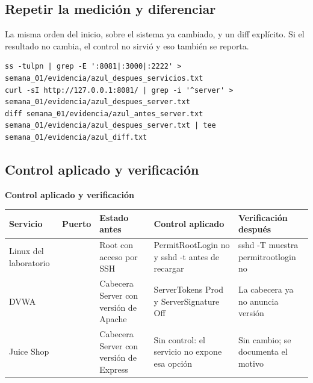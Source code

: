 \documentclass[11pt,a4paper]{article}
\begin{document}
\subsection{Repetir la medición y diferenciar}

La misma orden del inicio, sobre el sistema ya cambiado, y un diff explícito. Si el resultado no cambia, el control no sirvió y eso también se reporta.

\begin{lstlisting}[style=estiloCodigo]
ss -tulpn | grep -E ':8081|:3000|:2222' > semana_01/evidencia/azul_despues_servicios.txt
curl -sI http://127.0.0.1:8081/ | grep -i '^server' > semana_01/evidencia/azul_despues_server.txt
diff semana_01/evidencia/azul_antes_server.txt semana_01/evidencia/azul_despues_server.txt | tee semana_01/evidencia/azul_diff.txt
\end{lstlisting}

\subsection{Control aplicado y verificación}

\begin{center}
\begin{minipage}{\linewidth}
\centering
{\footnotesize
\textbf{Control aplicado y verificación}\par\smallskip
\begin{tabular}{@{}>{\raggedright\arraybackslash}p{2.20cm}>{\raggedright\arraybackslash}p{0.90cm}>{\raggedright\arraybackslash}p{2.40cm}>{\raggedright\arraybackslash}p{4.60cm}>{\raggedright\arraybackslash}p{3.70cm}@{}}
\toprule
\textbf{Servicio} & \textbf{Puerto} & \textbf{Estado antes} & \textbf{Control aplicado} & \textbf{Verificación después} \\
\midrule
Linux del laboratorio & 2222 & Root con acceso por SSH & PermitRootLogin no y sshd -t antes de recargar & sshd -T muestra permitrootlogin no \\
DVWA & 8081 & Cabecera Server con versión de Apache & ServerTokens Prod y ServerSignature Off & La cabecera ya no anuncia versión \\
Juice Shop & 3000 & Cabecera Server con versión de Express & Sin control: el servicio no expone esa opción & Sin cambio; se documenta el motivo \\
\bottomrule
\end{tabular}
}
\par{}
\end{minipage}
\end{center}
\end{document}
